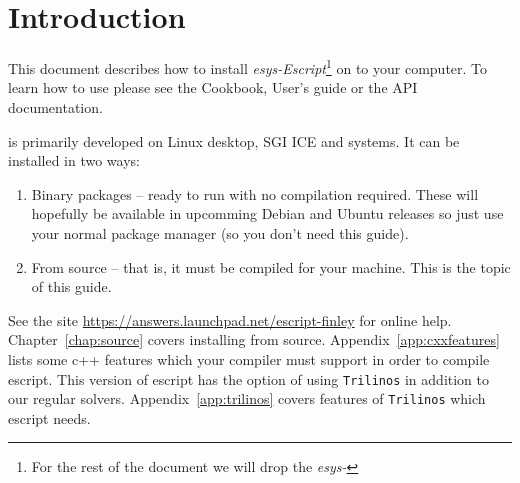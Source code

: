 %
%
%

\chapter{Introduction}
This document describes how to install \emph{esys-Escript}\footnote{For the rest of the document we will drop the \emph{esys-}} on to your computer.
To learn how to use \esfinley please see the Cookbook, User's guide or the API documentation.

\esfinley is primarily developed on Linux desktop, SGI ICE and \macosx systems.
It can be installed in two ways:
\begin{enumerate}
  \item Binary packages -- ready to run with no compilation required. 
  These will hopefully be available in upcomming Debian and Ubuntu releases so just use your normal package manager (so you don't need this guide).
  \item From source -- that is, it must be compiled for your machine.
This is the topic of this guide.
\end{enumerate}

See the site \url{https://answers.launchpad.net/escript-finley} for online help.
Chapter~\ref{chap:source} covers installing from source.
Appendix~\ref{app:cxxfeatures} lists some c++ features which your compiler must support in order to compile escript.
This version of escript has the option of using \texttt{Trilinos} in addition to our regular solvers.
Appendix~\ref{app:trilinos} covers features of \texttt{Trilinos} which escript needs. 



